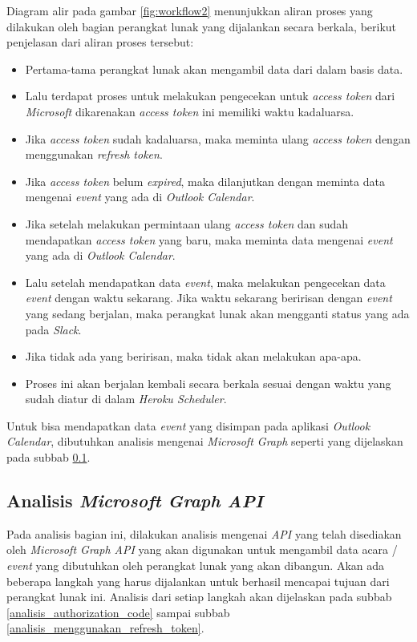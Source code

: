 \begin{itemize}
    Diagram alir pada gambar \ref{fig:workflow2} menunjukkan aliran proses yang dilakukan oleh bagian perangkat lunak yang dijalankan secara berkala, berikut penjelasan dari aliran proses tersebut:
    \begin{itemize}
        \item Pertama-tama perangkat lunak akan mengambil data dari dalam basis data. 
        \item Lalu terdapat proses untuk melakukan pengecekan untuk \textit{access token} dari \textit{Microsoft} dikarenakan \textit{access token} ini memiliki waktu kadaluarsa. 
        \item Jika \textit{access token} sudah kadaluarsa, maka meminta ulang \textit{access token} dengan menggunakan \textit{refresh token}.
        \item Jika \textit{access token} belum \textit{expired}, maka dilanjutkan dengan meminta data mengenai \textit{event} yang ada di \textit{Outlook Calendar}. 
        \item Jika setelah melakukan permintaan ulang \textit{access token} dan sudah mendapatkan \textit{access token} yang baru, maka meminta data mengenai \textit{event} yang ada di \textit{Outlook Calendar}. 
        \item Lalu setelah mendapatkan data \textit{event}, maka melakukan pengecekan data \textit{event} dengan waktu sekarang. Jika waktu sekarang beririsan dengan \textit{event} yang sedang berjalan, maka perangkat lunak akan mengganti status yang ada pada \textit{Slack}. 
        \item Jika tidak ada yang beririsan, maka tidak akan melakukan apa-apa. 
        \item Proses ini akan berjalan kembali secara berkala sesuai dengan waktu yang sudah diatur di dalam \textit{Heroku Scheduler}. 
    \end{itemize}
\end{itemize}

Untuk bisa mendapatkan data \textit{event} yang disimpan pada aplikasi \textit{Outlook Calendar}, dibutuhkan analisis mengenai \textit{Microsoft Graph} seperti yang dijelaskan pada subbab \ref{sec:analisis_microsoft_graph_api}.

\subsection{Analisis \textit{Microsoft Graph API}}
\label{sec:analisis_microsoft_graph_api}

Pada analisis bagian ini, dilakukan analisis mengenai \textit{API} yang telah disediakan oleh \textit{Microsoft Graph API} yang akan digunakan untuk mengambil data acara / \textit{event} yang dibutuhkan oleh perangkat lunak yang akan dibangun. Akan ada beberapa langkah yang harus dijalankan untuk berhasil mencapai tujuan dari perangkat lunak ini. Analisis dari setiap langkah akan dijelaskan pada subbab \ref{analisis_authorization_code} sampai subbab \ref{analisis_menggunakan_refresh_token}.

